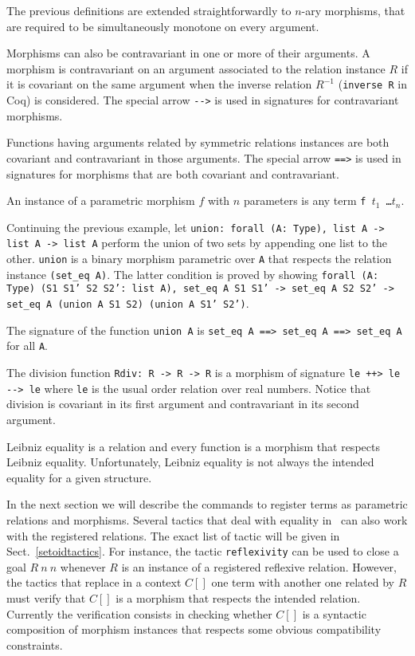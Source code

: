 The previous definitions are extended straightforwardly to $n$-ary morphisms,
that are required to be simultaneously monotone on every argument.

Morphisms can also be contravariant in one or more of their arguments.
A morphism is contravariant on an argument associated to the relation instance
$R$ if it is covariant on the same argument when the inverse relation
$R^{-1}$ (\texttt{inverse R} in Coq) is considered. 
The special arrow \texttt{-{}->} is used in signatures
for contravariant morphisms.

Functions having arguments related by symmetric relations instances are both
covariant and contravariant in those arguments. The special arrow
\texttt{==>} is used in signatures for morphisms that are both covariant
and contravariant.

An instance of a parametric morphism $f$ with $n$ parameters is any term
\texttt{f $t_1$ \ldots $t_n$}.

\begin{cscexample}[Morphisms]
Continuing the previous example, let
\texttt{union: forall (A: Type), list A -> list A -> list A} perform the union
of two sets by appending one list to the other. \texttt{union} is a binary
morphism parametric over \texttt{A} that respects the relation instance
\texttt{(set\_eq A)}. The latter condition is proved by showing
\texttt{forall (A: Type) (S1 S1' S2 S2': list A), set\_eq A S1 S1' ->
 set\_eq A S2 S2' -> set\_eq A (union A S1 S2) (union A S1' S2')}.

The signature of the function \texttt{union A} is
\texttt{set\_eq A ==> set\_eq A ==> set\_eq A} for all \texttt{A}.
\end{cscexample}

\begin{cscexample}
The division function \texttt{Rdiv: R -> R -> R} is a morphism of
signature \texttt{le ++> le -{}-> le} where \texttt{le} is
the usual order relation over real numbers. Notice that division is
covariant in its first argument and contravariant in its second
argument.
\end{cscexample}

Leibniz equality is a relation and every function is a
morphism that respects Leibniz equality. Unfortunately, Leibniz equality
is not always the intended equality for a given structure.

In the next section we will describe the commands to register terms as
parametric relations and morphisms. Several tactics that deal with equality
in \Coq\ can also work with the registered relations.
The exact list of tactic will be given in Sect.~\ref{setoidtactics}.
For instance, the
tactic \texttt{reflexivity} can be used to close a goal $R~n~n$ whenever
$R$ is an instance of a registered reflexive relation. However, the tactics
that replace in a context $C[]$ one term with another one related by $R$
must verify that $C[]$ is a morphism that respects the intended relation.
Currently the verification consists in checking whether $C[]$ is a syntactic
composition of morphism instances that respects some obvious
compatibility constraints.

